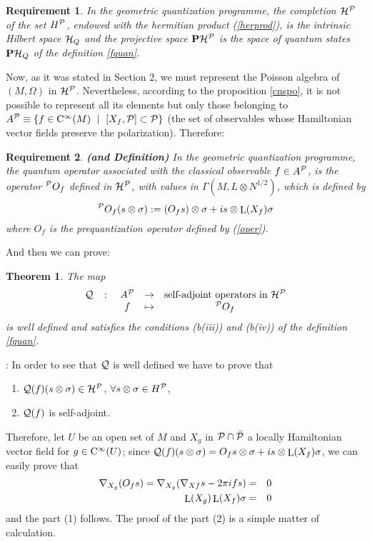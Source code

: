 \documentclass[12pt]{article}
\theoremstyle{plain}
\newtheorem{teor}{Theorem}
\newtheorem{require}{Requirement}
\def\beann{\begin{eqnarray*}}
\def\eeann{\end{eqnarray*}}
\def\Lie{\mathop{\rm L}\nolimits}
\def\Cinfty{{\rm C}^\infty}
\begin{document}
\begin{require}
In the geometric quantization programme, the completion ${\cal H}^{\cal
P}$
of the set $H^{\cal P}$, endowed with the hermitian product
(\ref{herprod}), is the intrinsic Hilbert space ${\cal H}_Q$
and the projective space ${\bf P}{\cal H}^{\cal P}$
is the space of quantum states ${\bf P}{\cal H}_Q$ of the definition
\ref{fquan}.
\end{require}

Now, as it was stated in Section 2, we must represent the Poisson
algebra of
$(M,\Omega )$ in ${\cal H}^{\cal P}$.
Nevertheless, according to the proposition \ref{cnspo},
it is not possible to represent
all its elements but only those belonging to
$A^{\cal P} \equiv\{ f \in \Cinfty (M) \ \mid \ [X_f,\cal P] \subset
\cal P \}$
(the set of observables whose Hamiltonian vector fields preserve the
polarization).
Therefore:

\begin{require}
{\bf (and Definition)}
In the geometric quantization programme,
the quantum operator associated with the classical observable
$f \in A^{\cal P}$, is the operator $^{\cal P}O_f$ defined in ${\cal
H}^{\cal P}$,
with values in $\Gamma (M,L \otimes N^{1/2})$, which is defined by
$$
^{\cal P}O_f (s \otimes \sigma) :=
(O_f s)\otimes \sigma + i s \otimes \Lie(X_f)\sigma
$$
where $O_f$ is the prequantization operator defined by (\ref{oper}).
\end{require}

And then we can prove:

\begin{teor}
The map
$$
\begin{array}{ccccc}
{\cal Q} & \colon & A^{\cal P} & \to &
\mbox{{\rm self-adjoint operators in} ${\cal H}^{\cal P}$}
\\
& & f & \mapsto & ^{\cal P}O_f
\end{array}
$$
is well defined and satisfies the conditions (b(iii)) and (b(iv)) of the
definition \ref{fquan}.
\end{teor}
:
In order to see that ${\cal Q}$ is well defined we have to prove that
\begin{enumerate}
\item
${\cal Q}(f)(s \otimes \sigma) \in {\cal H}^{\cal P}$,
$\forall s \otimes \sigma\in H^{\cal P}$,
\item
${\cal Q}(f)$ is self-adjoint.
\end{enumerate}
Therefore, let $U$ be an open set of $M$ and $X_g$ in ${\cal P}
\cap \bar {\cal P}$ a locally Hamiltonian vector field for $g \in
\Cinfty (U)$;
 since ${\cal Q}(f)(s \otimes \sigma)
 =O_f s \otimes\sigma + i s \otimes
\Lie(X_f)\sigma$, we can easily prove that \beann \nabla_{X_g}(O_f
s) = \nabla_{X_g}(\nabla_{Xf}s-2 \pi i f s) &=& 0
\\
\Lie(X_g)\Lie(X_f)\sigma &=& 0
\eeann
and the part (1) follows. The proof of the part (2) is a simple matter
of calculation.
\end{document}
